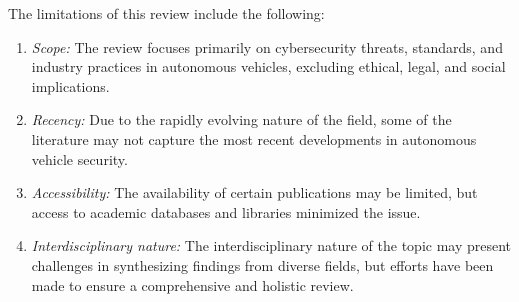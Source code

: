 The limitations of this review include the following:
\begin{enumerate}
    \item \textit{Scope:} The review focuses primarily on cybersecurity threats, standards, and industry practices in autonomous vehicles, excluding ethical, legal, and social implications.
    \item \textit{Recency:} Due to the rapidly evolving nature of the field, some of the literature may not capture the most recent developments in autonomous vehicle security.
    \item \textit{Accessibility:} The availability of certain publications may be limited, but access to academic databases and libraries minimized the issue.
    \item \textit{Interdisciplinary nature:} The interdisciplinary nature of the topic may present challenges in synthesizing findings from diverse fields, but efforts have been made to ensure a comprehensive and holistic review.
\end{enumerate}

\newpage
